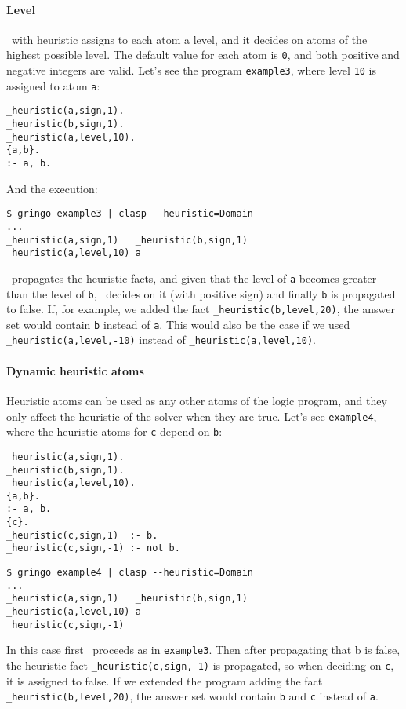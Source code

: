 \paragraph{Level}
\clasp\ with heuristic  assigns to each atom a level, and it decides on atoms of the highest possible level.
The default value for each atom is \texttt{0},  and both positive and negative integers are valid.
Let's see the program \texttt{example3}, where level \texttt{10} is assigned to atom \texttt{a}:
\begin{verbatim}
_heuristic(a,sign,1).
_heuristic(b,sign,1).
_heuristic(a,level,10).
{a,b}.
:- a, b.
\end{verbatim}
And the execution:
\begin{verbatim}
$ gringo example3 | clasp --heuristic=Domain
...
_heuristic(a,sign,1)   _heuristic(b,sign,1)
_heuristic(a,level,10) a\end{verbatim}

\clasp\ propagates the heuristic facts, and given that the level of \texttt{a} becomes greater than the level of \texttt{b},
\clasp\ decides on it (with positive sign) and finally \texttt{b} is propagated to false.
If, for example, we added the fact \texttt{\_heuristic(b,level,20)},  the answer set would contain \texttt{b} instead of \texttt{a}.
This would also be the case if we used \texttt{\_heuristic(a,level,-10)} instead of \texttt{\_heuristic(a,level,10)}.

\paragraph{Dynamic heuristic atoms}

Heuristic atoms can be used as any other atoms of the logic program,
and they only affect the heuristic of the solver when they are true.
Let's see \texttt{example4}, where the heuristic atoms for \texttt{c} depend on \texttt{b}:
\begin{verbatim}
_heuristic(a,sign,1).
_heuristic(b,sign,1).
_heuristic(a,level,10).
{a,b}.
:- a, b.
{c}.
_heuristic(c,sign,1)  :- b.
_heuristic(c,sign,-1) :- not b.
\end{verbatim}
\begin{verbatim}
$ gringo example4 | clasp --heuristic=Domain
...
_heuristic(a,sign,1)   _heuristic(b,sign,1)
_heuristic(a,level,10) a
_heuristic(c,sign,-1)\end{verbatim}

In this case first \clasp\ proceeds as in \texttt{example3}.
Then after propagating that b is false,  the heuristic fact \texttt{\_heuristic(c,sign,-1)} is propagated,
so when deciding on \texttt{c}, it is assigned to false.  If we extended the program adding the fact \texttt{\_heuristic(b,level,20)},
the answer set would contain \texttt{b} and \texttt{c} instead of \texttt{a}.

